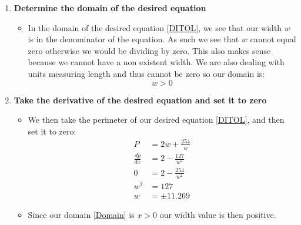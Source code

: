 \documentclass[12pt]{article}
\begin{document}
\begin{enumerate}
  \item \textbf{Determine the domain of the desired equation}
    \begin{itemize}
      \item In the domain of the desired equation \eqref{DITOL}, we see that our width $w$ is in the denominator of the equation. As such we see that $w$ cannot equal zero otherwise we would be dividing by zero. This also makes sense because we cannot have a non existent width. We are also dealing with units measuring length and thus cannot be zero so our domain is:
      \begin{equation}
        w > 0 \tag{Domain} \label{Domain}
      \end{equation}
    \end{itemize}

  \item \textbf{Take the derivative of the desired equation and set it to zero}
    \begin{itemize}
      \item We then take the perimeter of our desired equation \eqref{DITOL}, and then set it to zero:
      \begin{equation}
        \begin{split}
          P &= 2w + \frac{254}{w}\\
          \frac{dp}{dx} &= 2 - \frac{127}{w^2}\\
          0 &= 2 - \frac{254}{w^2}\\
          w^2 &= 127\\
          w &= \pm 11.269
        \end{split}
        \tag{Width Value} \label{w}
      \end{equation}
      \item Since our domain \eqref{Domain} is $x > 0$ our width value is then positive.
    \end{itemize}


\end{enumerate}
\end{document}
